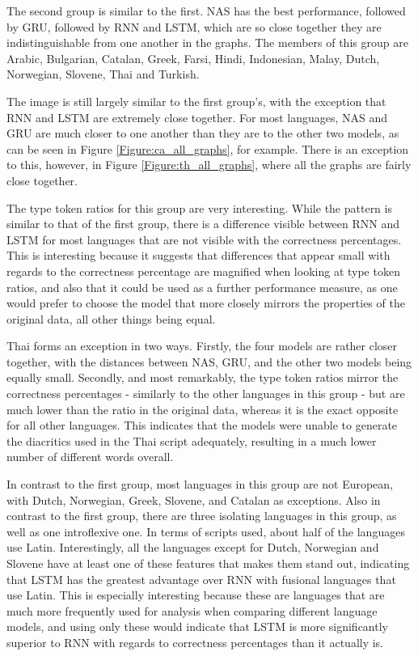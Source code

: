 \documentclass[11pt,a4paper,twoside,openright]{scrbook}
\begin{document}
The second group is similar to the first. NAS has the best performance, followed by GRU, followed by RNN and LSTM, which are so close together they are indistinguishable from one another in the graphs. The members of this group are Arabic, Bulgarian, Catalan, Greek, Farsi, Hindi, Indonesian, Malay, Dutch, Norwegian, Slovene, Thai and Turkish. 

The image is still largely similar to  the first group's, with the exception that RNN and LSTM are extremely close together. For most languages, NAS and GRU are much closer to one another than they are to the other two models, as can be seen in Figure \ref{Figure:ca_all_graphs}, for example. There is an exception to this, however, in Figure \ref{Figure:th_all_graphs}, where all the graphs are fairly close together. 

The type token ratios for this group are very interesting. While the pattern is similar to that of the first group, there is a difference visible between RNN and LSTM for most languages that are not visible with the correctness percentages. This is interesting because it suggests that differences that appear small with regards to the correctness percentage are magnified when looking at type token ratios, and also that it could be used as a further performance measure, as one would prefer to choose the model that more closely mirrors the properties of the original data, all other things being equal. 

Thai forms an exception in two ways. Firstly, the four models are rather closer together, with the distances between NAS, GRU, and the other two models being equally small. Secondly, and most remarkably, the type token ratios mirror the correctness percentages - similarly to the other languages in this group - but are much lower than the ratio in the original data, whereas it is the exact opposite for all other languages. This indicates that the models were unable to generate the diacritics used in the Thai script adequately,  resulting in a much lower number of different words overall. 

In contrast to the first group, most languages in this group are not European, with Dutch, Norwegian, Greek, Slovene, and Catalan as exceptions. Also in contrast to the first group, there are three isolating languages in this group, as well as one introflexive one. In terms of scripts used, about half of the languages use Latin. Interestingly, all the languages except for Dutch, Norwegian and Slovene have at least one of these features that makes them stand out, indicating that LSTM has the greatest advantage over RNN with fusional languages that use Latin. This is especially interesting because these are languages that are much more frequently used for analysis when comparing different language models, and using only these would indicate that LSTM is more significantly superior to RNN with regards to correctness percentages than it actually is.   
\end{document}
